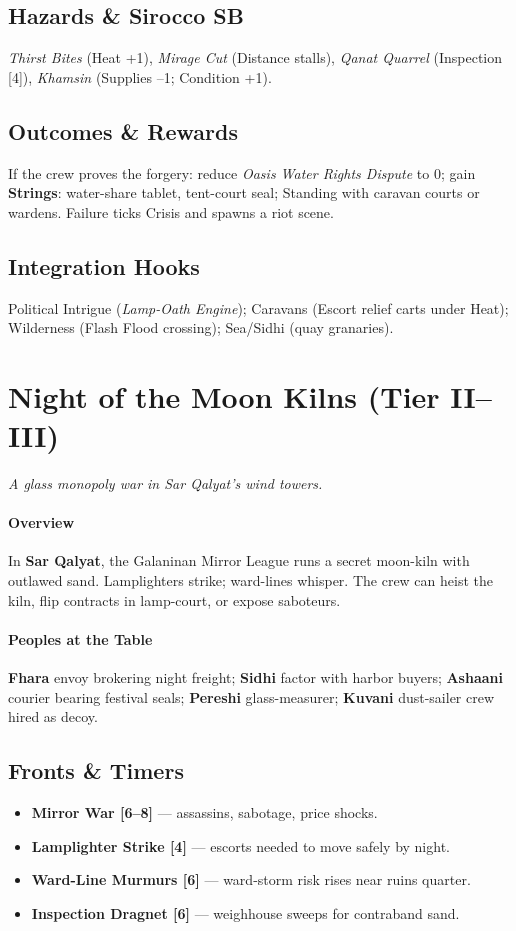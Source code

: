 \documentclass[11pt]{article}
\begin{document}
\subsection*{Hazards \& Sirocco SB}
\emph{Thirst Bites} (Heat +1), \emph{Mirage Cut} (Distance stalls), \emph{Qanat Quarrel} (Inspection [4]), \emph{Khamsin} (Supplies --1; Condition +1).

\subsection*{Outcomes \& Rewards}
If the crew proves the forgery: reduce \emph{Oasis Water Rights Dispute} to 0; gain \textbf{Strings}: water-share tablet, tent-court seal; Standing with caravan courts or wardens. Failure ticks Crisis and spawns a riot scene.

\subsection*{Integration Hooks}
Political Intrigue (\emph{Lamp-Oath Engine}); Caravans (Escort relief carts under Heat); Wilderness (Flash Flood crossing); Sea/Sidhi (quay granaries).

\section*{Night of the Moon Kilns (Tier II--III)}
\textit{A glass monopoly war in Sar Qalyat's wind towers.}

\paragraph{Overview} In \textbf{Sar Qalyat}, the Galaninan Mirror League runs a secret moon-kiln with outlawed sand. Lamplighters strike; ward-lines whisper. The crew can heist the kiln, flip contracts in lamp-court, or expose saboteurs.

\paragraph{Peoples at the Table}
\textbf{Fhara} envoy brokering night freight; \textbf{Sidhi} factor with harbor buyers; \textbf{Ashaani} courier bearing festival seals; \textbf{Pereshi} glass-measurer; \textbf{Kuvani} dust-sailer crew hired as decoy.

\subsection*{Fronts \& Timers}
\begin{itemize}
  \item \textbf{Mirror War [6--8]} --- assassins, sabotage, price shocks.
  \item \textbf{Lamplighter Strike [4]} --- escorts needed to move safely by night.
  \item \textbf{Ward-Line Murmurs [6]} --- ward-storm risk rises near ruins quarter.
  \item \textbf{Inspection Dragnet [6]} --- weighhouse sweeps for contraband sand.
\end{itemize}
\end{document}
